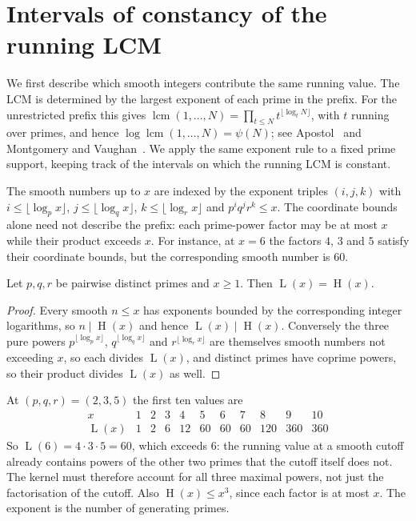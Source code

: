 \documentclass[11pt]{article}
\theoremstyle{remark}
\theoremstyle{plain}
\newcommand{\hgt}{\operatorname{H}}
\newcommand{\Lprefix}{\operatorname{L}}
\begin{document}
\section{Intervals of constancy of the running LCM}\label{long269:sec:lcm}

We first describe which smooth integers contribute the same running value.
The LCM is determined by the largest exponent of each prime in the prefix.
For the unrestricted prefix this gives
$\operatorname{lcm}(1,\ldots,N)=\prod_{t\le N}t^{\lfloor\log_t N\rfloor}$,
with $t$ running over primes, and hence
$\log\operatorname{lcm}(1,\ldots,N)=\psi(N)$; see Apostol~\cite{apostol1976}
and Montgomery and Vaughan~\cite{montgomeryvaughan2007}.
We apply the same exponent rule to a fixed prime support, keeping track
of the intervals on which the running LCM is constant.

The smooth numbers up to $x$ are indexed by the exponent triples $(i,j,k)$ with
$i\le\lfloor\log_p x\rfloor$, $j\le\lfloor\log_q x\rfloor$,
$k\le\lfloor\log_r x\rfloor$ and $p^{i}q^{j}r^{k}\le x$.
The coordinate bounds alone need not describe the prefix: each prime-power
factor may be at most $x$ while their product exceeds $x$.  For instance,
at $x=6$ the factors $4$, $3$ and $5$ satisfy their coordinate bounds,
but the corresponding smooth number is $60$.

\begin{theorem}\label{long269:res:lcm}
Let $p,q,r$ be pairwise distinct primes and $x\ge1$.  Then
$\Lprefix(x)=\hgt(x)$.
\end{theorem}

\begin{proof}
Every smooth $n\le x$ has exponents bounded by the corresponding integer
logarithms, so $n\mid\hgt(x)$ and hence $\Lprefix(x)\mid\hgt(x)$.  Conversely
the three pure powers $p^{\lfloor\log_p x\rfloor}$,
$q^{\lfloor\log_q x\rfloor}$ and $r^{\lfloor\log_r x\rfloor}$ are themselves
smooth numbers not exceeding $x$, so each divides $\Lprefix(x)$, and distinct
primes have coprime powers, so their product divides $\Lprefix(x)$ as well.
\end{proof}


At $(p,q,r)=(2,3,5)$ the first ten values are
\[
\begin{array}{c|cccccccccc}
x&1&2&3&4&5&6&7&8&9&10\\ \hline
\Lprefix(x)&1&2&6&12&60&60&60&120&360&360
\end{array}
\]
So $\Lprefix(6)=4\cdot3\cdot5=60$, which exceeds $6$: the running value at a
smooth cutoff already contains powers of the other two primes that the cutoff
itself does not.  The kernel must therefore account for all three
maximal powers, not just the factorisation of the cutoff.
Also $\hgt(x)\le x^3$, since each factor is at most $x$.
The exponent is the number of generating primes.
\end{document}
